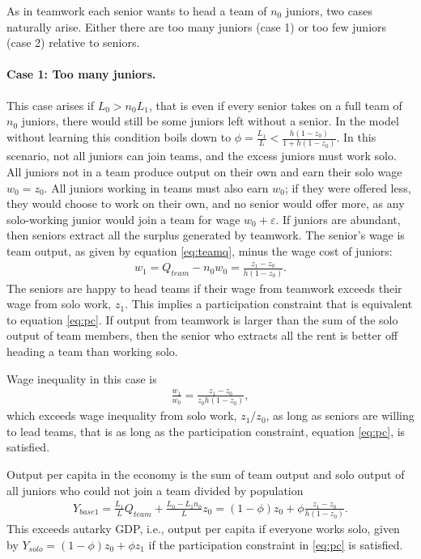 \documentclass[12pt]{article}
\begin{document}
As in teamwork each senior wants to head a team of $n_0$ juniors, two cases naturally arise. Either there are too many juniors (case 1) or too few juniors (case 2) relative to seniors.

\paragraph{Case 1: Too many juniors.}  This case arises if $L_0 > n_0 L_1$, that is even if every senior takes on a full team of $n_0$ juniors, there would still be some juniors left without a senior. In the model without learning this condition boils down to $\phi=\frac{L_1}{L}<\frac{h(1-z_0)}{1+h(1-z_0)}$. In this scenario, not all juniors can join teams, and the excess juniors must work solo. All juniors not in a team produce output on their own and earn their solo wage $w_0=z_0$. All juniors working in teams must also earn $w_0$; if they were offered less, they would choose to work on their own, and no senior would offer more, as any solo-working junior would join a team for wage $w_0+\varepsilon$. If juniors are abundant, then seniors extract all the surplus generated by teamwork. The senior's wage is team output, as given by equation \eqref{eq:teamq}, minus the wage cost of juniors:
\begin{align}\label{eq:w1}
w_1=Q_{team}-n_0w_0 = \frac{z_1-z_0}{h(1-z_0)}.
\end{align}
The seniors are happy to head teams if their wage from teamwork exceeds their wage from solo work, $z_1$. This implies a participation constraint that is equivalent to equation \eqref{eq:pc}. If output from teamwork is larger than the sum of the solo output of team members, then the senior who extracts all the rent is better off heading a team than working solo.

Wage inequality in this case is
\begin{align}\label{eq:ineq1}
\frac{w_1}{w_0} = \frac{z_1-z_0}{z_0h(1-z_0)},
\end{align} 
which exceeds wage inequality from solo work, $z_1/z_0$, as long as seniors are willing to lead teams, that is as long as the participation constraint, equation \eqref{eq:pc}, is satisfied. 

Output per capita in the economy is the sum of team output and solo output of all juniors who could not join a team divided by population
\begin{align}\label{eq:y1}
Y_{base1} = \frac{L_1}{L}Q_{team}+\frac{L_0-L_1n_0}{L}z_0=(1-\phi)z_0+\phi\frac{z_1-z_0}{h(1-z_0)}.
\end{align}
This exceeds autarky GDP, i.e., output per capita if everyone works solo, given by $Y_{solo} = (1-\phi)z_0+\phi z_1$ if the participation constraint in \eqref{eq:pc} is satisfied.
\end{document}
